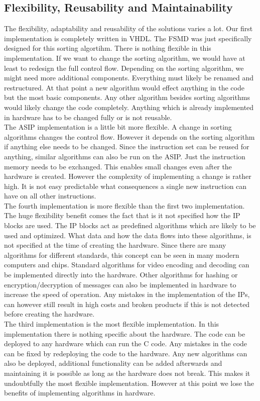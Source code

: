 \documentclass[conference]{IEEEtran}
\begin{document}
\subsection{Flexibility, Reusability and Maintainability}
The flexibility, adaptability and reusability of the solutions varies a lot. Our first implementation is completely written in VHDL. The FSMD was just specifically designed for this sorting algortihm. There is nothing flexible in this implementation. If we want to change the sorting algorithm, we would have at least to redesign the full control flow. Depending on the sorting algorithm, we might need more additional components. Everything must likely be renamed and restructured. At that point a new algorithm would effect anything in the code but the most basic components. Any other algorithm besides sorting algorithms would likely change the code completely. Anything which is already implemented in hardware has to be changed fully or is not reusable. \\
The ASIP implementation is a little bit more flexible. A change in sorting algorithms changes the control flow. However it depends on the sorting algorithm if anything else needs to be changed. Since the instruction set can be reused for anything, similar algorithms can also be run on the ASIP. Just the instruction memory needs to be exchanged. This enables small changes even after the hardware is created. However the complexity of implementing a change is rather high. It is not easy predictable what consequences a single new instruction can have on all other instructions. \\
The fourth implementation is more flexible than the first two implementation. The huge flexibility benefit comes the fact that is it not specified how the IP blocks are used. The IP blocks act as predefined algorithms which are likely to be used and optimized. What data and how the data flows into these algorithms, is not specified at the time of creating the hardware. Since there are many algorithms for different standards, this concept can be seen in many modern computers and chips. Standard algorithms for video encoding and decoding can be implemented directly into the hardware. Other algorithms for hashing or encryption/decryption of messages can also be implemented in hardware to increase the speed of operation. Any mistakes in the implementation of the IPs, can however still result in high costs and broken products if this is not detected before creating the hardware. \\
The third implementation is the most flexible implementation. In this implementation there is nothing specific about the hardware. The code can be deployed to any hardware which can run the C code. Any mistakes in the code can be fixed by redeploying the code to the hardware. Any new algorithms can also be deployed, additional functionality can be added afterwards and maintaining it is possible as long as the hardware does not break. This makes it undoubtfully the most flexible implementation. However at this point we lose the benefits of implementing algorithms in hardware. \\
\end{document}

